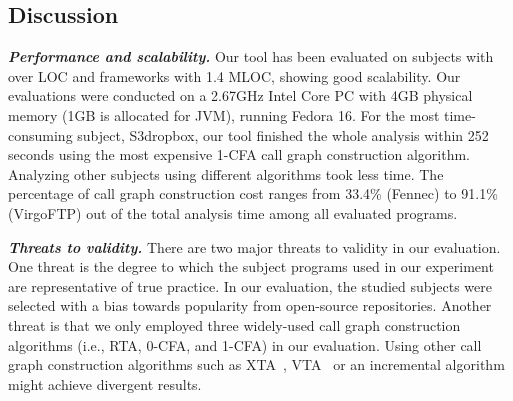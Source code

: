 \begin{table}[t]
\begin{center}
\begin{tabular}{|l||c|c|c|c|c|c|}
 \hline
\end{tabular}
\end{center}
\vspace{-15pt}
\end{table}


\subsection{Discussion}

\noindent \textbf{\textit{Performance and scalability.}} Our tool
has been evaluated on \subnum subjects with over \totaloc LOC and frameworks
with 1.4 MLOC, showing good scalability. Our evaluations
were conducted on a 2.67GHz Intel Core PC with 4GB
physical memory (1GB is allocated for JVM), running Fedora 16.
For the most time-consuming subject, S3dropbox, our tool finished the whole analysis
within 252 seconds using the most expensive 1-CFA call graph construction
algorithm. Analyzing other subjects using different algorithms took less time.
The percentage of call graph construction cost ranges
from 33.4\% (Fennec) to 91.1\% (VirgoFTP) out of
the total analysis time among all evaluated programs.



\vspace{1mm}

\noindent \textbf{\textit{Threats to validity.}}
There are two major threats to validity in our evaluation. 
One threat is the degree to which the subject programs
used in our experiment are representative of true practice.
In our evaluation, the studied subjects were selected with a bias towards popularity from
open-source repositories. Another threat is that we only employed three
widely-used call graph construction algorithms (i.e., RTA, 0-CFA, and 1-CFA) 
in our evaluation. Using other 
call graph construction algorithms such as XTA~\cite{xta}, VTA~\cite{Sundaresan:2000} or
an incremental algorithm~\cite{inccg} might achieve divergent results.


